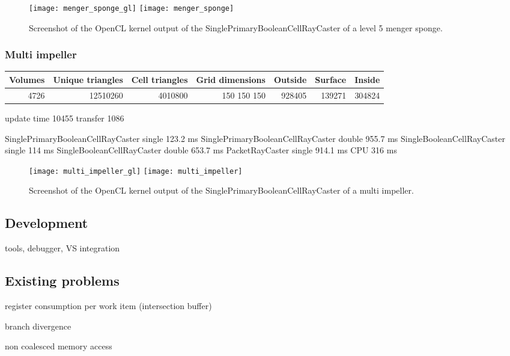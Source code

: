 \begin{figure}
\centering
\texttt{[image: menger\_sponge\_gl]}
\texttt{[image: menger\_sponge]}
\caption{Screenshot of the OpenCL kernel output of the SinglePrimaryBooleanCellRayCaster of a level 5 menger sponge.}
\label{fig:menger_sponge}
\end{figure}

\subsubsection{Multi impeller}

\begin{tabular}{r r r r r r r}
Volumes & Unique triangles & Cell triangles & Grid dimensions & Outside & Surface & Inside \\
\hline
4726 & 12510260 & 4010800 & 150 150 150 & 928405 & 139271 & 304824 \\
\end{tabular}

update time 10455
transfer 1086

SinglePrimaryBooleanCellRayCaster single 123.2 ms
SinglePrimaryBooleanCellRayCaster double 955.7 ms
SingleBooleanCellRayCaster single 114 ms
SingleBooleanCellRayCaster double 653.7 ms
PacketRayCaster single 914.1 ms
CPU 316 ms

\begin{figure}
\centering
\texttt{[image: multi\_impeller\_gl]}
\texttt{[image: multi\_impeller]}
\caption{Screenshot of the OpenCL kernel output of the SinglePrimaryBooleanCellRayCaster of a multi impeller.}
\label{fig:multi_impeller}
\end{figure}

\subsection{Development}

tools, debugger, VS integration

\subsection{Existing problems}

register consumption per work item (intersection buffer)

branch divergence

non coalesced memory access